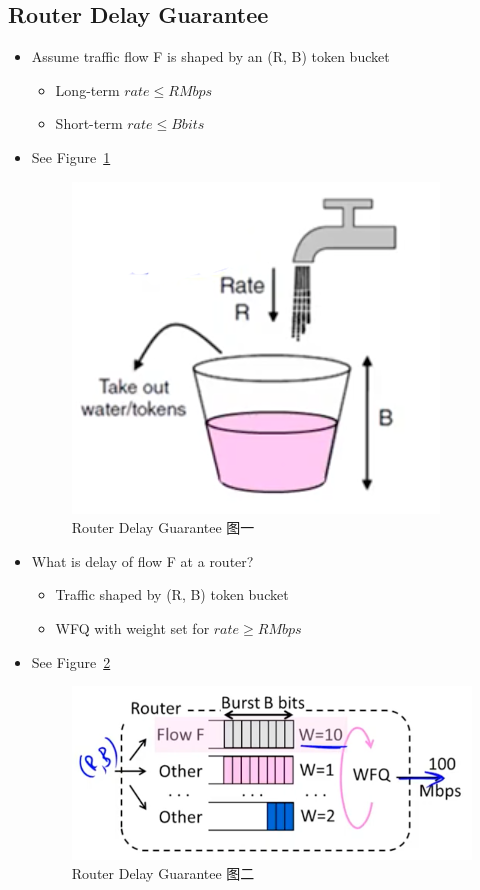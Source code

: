 \documentclass[12pt]{ctexart}   %
\begin{document}
	\subsection{Router Delay Guarantee}
	\begin{itemize}
		\item Assume traffic flow F is shaped by an (R, B) token bucket
		\begin{itemize}
			\item Long-term $rate \leqslant R Mbps$
			\item Short-term $rate \leqslant B bits$
		\end{itemize}
		\item See Figure~\ref{fig:9-7-6}
		  
		\begin{figure}[h!] %
		\centering
		\includegraphics[scale=0.7]{images/9-7-6}
		\caption{ Router Delay Guarantee 图一}
		\label{fig:9-7-6}
		\end{figure}

		\item  What is delay of flow F at a router?
		\begin{itemize}
			\item Traffic shaped by (R, B) token bucket
			\item WFQ with weight set for $rate \geqslant R Mbps$
		\end{itemize}
		\item See Figure~\ref{fig:9-7-7}
		  
		\begin{figure}[h!] %
		\centering
		\includegraphics[scale=0.7]{images/9-7-7}
		\caption{ Router Delay Guarantee 图二}
		\label{fig:9-7-7}
		\end{figure}


\end{itemize}
\end{document}
